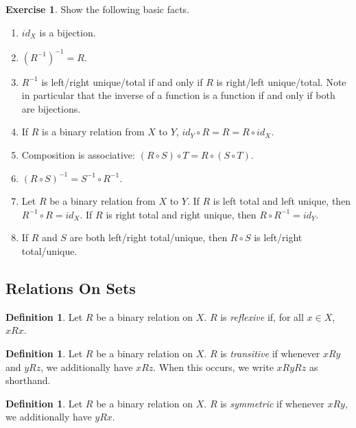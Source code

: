 \documentclass[letterpaper]{article}
\theoremstyle{definition}
\newtheorem{definition}[theorem]{Definition}
\newtheorem{exercise}[theorem]{Exercise}
\newcommand{\defterm}{\emph}
\newcommand{\inverse}[1]{{#1^{-1}}}
\newcommand{\compose}{\circ}
\begin{document}
\begin{exercise}
  Show the following basic facts.
  \begin{enumerate}
    \item \(id_X\) is a bijection.
    \item \(\inverse{(\inverse{R})} = R\).
    \item \(\inverse{R}\) is left/right unique/total if and only if
      \(R\) is right/left unique/total.  Note in particular that the
      inverse of a function is a function if and only if both are
      bijections.
    \item If \(R\) is a binary relation from \(X\) to \(Y\), \(id_Y
      \compose R = R = R \compose id_X\).
    \item Composition is associative: \((R \compose S) \compose T = R
      \compose (S \compose T)\).
    \item \(\inverse{(R \compose S)} = \inverse{S} \compose
      \inverse{R}\).
    \item Let \(R\) be a binary relation from \(X\) to \(Y\).  If
      \(R\) is left total and left unique, then \(\inverse{R} \compose
      R = id_X\).  If \(R\) is right total and right unique, then \(R
      \compose \inverse{R} = id_Y\).
    \item If \(R\) and \(S\) are both left/right total/unique, then
      \(R \compose S\) is left/right total/unique.
  \end{enumerate}
\end{exercise}

\subsection{Relations On Sets}
\begin{definition}
  Let \(R\) be a binary relation on \(X\).  \(R\) is
  \defterm{reflexive} if, for all \(x \in X\), \(xRx\).
\end{definition}

\begin{definition}
  Let \(R\) be a binary relation on \(X\).  \(R\) is
  \defterm{transitive} if whenever \(xRy\) and \(yRz\), we
  additionally have \(xRz\).  When this occurs, we write \(xRyRz\) as
  shorthand.
\end{definition}

\begin{definition}
  Let \(R\) be a binary relation on \(X\).  \(R\) is
  \defterm{symmetric} if whenever \(xRy\), we additionally have
  \(yRx\).
\end{definition}
\end{document}
